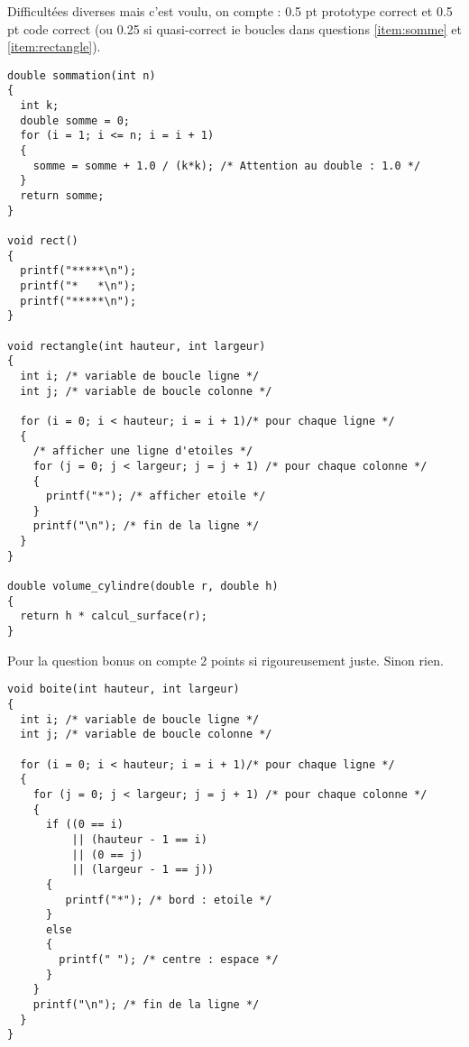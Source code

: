 \begin{correction}
Difficultées diverses mais c'est voulu, on compte :
0.5 pt prototype correct et 0.5 pt code correct (ou 0.25 si
quasi-correct ie boucles dans questions \ref{item:somme} et \ref{item:rectangle}).
\begin{verbatim}
double sommation(int n)
{
  int k;
  double somme = 0;
  for (i = 1; i <= n; i = i + 1)
  {
    somme = somme + 1.0 / (k*k); /* Attention au double : 1.0 */
  }
  return somme;
}

void rect()
{
  printf("*****\n");
  printf("*   *\n");
  printf("*****\n");
}

void rectangle(int hauteur, int largeur)
{
  int i; /* variable de boucle ligne */
  int j; /* variable de boucle colonne */

  for (i = 0; i < hauteur; i = i + 1)/* pour chaque ligne */
  { 
    /* afficher une ligne d'etoiles */     
    for (j = 0; j < largeur; j = j + 1) /* pour chaque colonne */
    {
      printf("*"); /* afficher etoile */
    }
    printf("\n"); /* fin de la ligne */
  }
}

double volume_cylindre(double r, double h)
{
  return h * calcul_surface(r);
}
\end{verbatim}

Pour la question bonus on compte 2 points si rigoureusement
juste. Sinon rien.

\begin{verbatim}
void boite(int hauteur, int largeur)
{
  int i; /* variable de boucle ligne */
  int j; /* variable de boucle colonne */

  for (i = 0; i < hauteur; i = i + 1)/* pour chaque ligne */
  { 
    for (j = 0; j < largeur; j = j + 1) /* pour chaque colonne */
    {
      if ((0 == i) 
          || (hauteur - 1 == i) 
          || (0 == j)
          || (largeur - 1 == j))
      {
         printf("*"); /* bord : etoile */
      }
      else
      {
        printf(" "); /* centre : espace */
      }
    }
    printf("\n"); /* fin de la ligne */
  }
}
\end{verbatim}

\end{correction}
